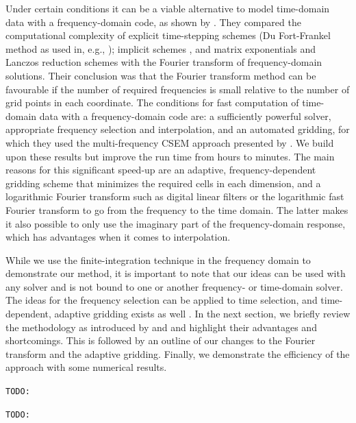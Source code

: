 \documentclass[extra, camera,%
    onecolumn,   %
    referee,     %
]{gji}
\newcommand{\rtodo}{{\color{red}\texttt{TODO:}}\xspace}
\begin{document}
Under certain conditions it can be a viable alternative to model time-domain
data with a frequency-domain code, as shown by \cite{GEO.08.Mulder}. They
compared the computational complexity of explicit time-stepping schemes (Du
Fort-Frankel method as used in, e.g., \cite{GEO.04.Commer, GEO.07.Maao});
implicit schemes \citep[e.g., ][]{GEO.04.Haber}, and matrix exponentials and
Lanczos reduction schemes \cite[e.g., ][]{RS.94.Druskin} with the Fourier
transform of frequency-domain solutions. Their conclusion was that the Fourier
transform method can be favourable if the number of required frequencies is
small relative to the number of grid points in each coordinate. The conditions
for fast computation of time-domain data with a frequency-domain code are: a
sufficiently powerful solver, appropriate frequency selection and
interpolation, and an automated gridding, for which they used the
multi-frequency CSEM approach presented by \cite{GEO.07.Plessix}. We build upon
these results but improve the run time from hours to minutes. The main reasons
for this significant speed-up are an adaptive, frequency-dependent gridding
scheme that minimizes the required cells in each dimension, and a logarithmic
Fourier transform such as digital linear filters \citep[DLF, ][]{GP.71.Ghosh}
or the logarithmic fast Fourier transform \citep[FFTLog, ][]{RAS.00.Hamilton}
to go from the frequency to the time domain. The latter makes it also possible
to only use the imaginary part of the frequency-domain response, which has
advantages when it comes to interpolation.

While we use the finite-integration technique \citep{AEU.77.Weiland} in the
frequency domain to demonstrate our method, it is important to note that our
ideas can be used with any solver and is not bound to one or another frequency-
or time-domain solver. The ideas for the frequency selection can be applied to
time selection, and time-dependent, adaptive gridding exists as well
\citep[e.g., ][]{RS.06.Commer}. In the next section, we briefly review the
methodology as introduced by \cite{GEO.07.Plessix} and \cite{GEO.08.Mulder} and
highlight their advantages and shortcomings. This is followed by an outline of
our changes to the Fourier transform and the adaptive gridding. Finally, we
demonstrate the efficiency of the approach with some numerical results.

\rtodo {}

\rtodo {}
\end{document}

